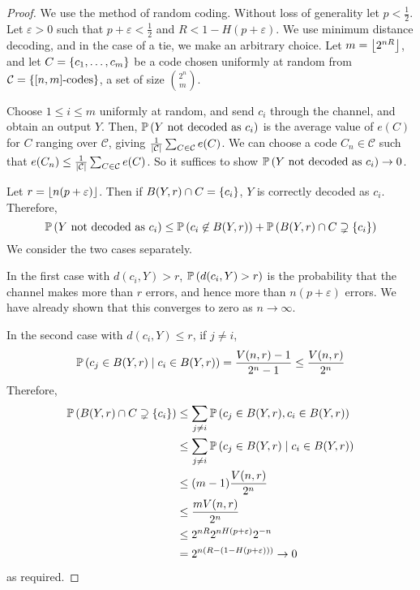 \begin{proof}
    We use the method of random coding.
    Without loss of generality let \( p < \frac{1}{2} \).
    Let \( \varepsilon > 0 \) such that \( p + \varepsilon < \frac{1}{2} \) and \( R < 1 - H(p + \varepsilon) \).
    We use minimum distance decoding, and in the case of a tie, we make an arbitrary choice.
    Let \( m = \floor*{2^{nR}} \), and let \( C = \qty{c_1, \dots, c_m} \) be a code chosen uniformly at random from \( \mathcal C = \qty{[n,m]\text{-codes}} \), a set of size \( \binom{2^n}{m} \).

    Choose \( 1 \leq i \leq m \) uniformly at random, and send \( c_i \) through the channel, and obtain an output \( Y \).
    Then, \( \prob{Y \text{ not decoded as } c_i} \) is the average value of \( e(C) \) for \( C \) ranging over \( \mathcal C \), giving \( \frac{1}{\abs{\mathcal C}} \sum_{C \in \mathcal C} e(C) \).
    We can choose a code \( C_n \in \mathcal C \) such that \( e(C_n) \leq \frac{1}{\abs{\mathcal C}}\sum_{C \in \mathcal C} e(C) \).
    So it suffices to show \( \prob{Y \text{ not decoded as } c_i} \to 0 \).

    Let \( r = \floor*{n(p + \varepsilon)} \).
    Then if \( B(Y,r) \cap C = \qty{c_i} \), \( Y \) is correctly decoded as \( c_i \).
    Therefore,
    \[ \prob{Y \text{ not decoded as } c_i} \leq \prob{c_i \not\in B(Y,r)} + \prob{B(Y,r) \cap C \supsetneq \qty{c_i}} \]
    We consider the two cases separately.

    In the first case with \( d(c_i,Y) > r \), \( \prob{d(c_i,Y) > r} \) is the probability that the channel makes more than \( r \) errors, and hence more than \( n(p + \varepsilon) \) errors.
    We have already shown that this converges to zero as \( n \to \infty \).

    In the second case with \( d(c_i,Y) \leq r \), if \( j \neq i \),
    \[ \prob{c_j \in B(Y,r) \mid c_i \in B(Y,r)} = \frac{V(n,r) - 1}{2^n - 1} \leq \frac{V(n,r)}{2^n} \]
    Therefore,
    \begin{align*}
        \prob{B(Y,r) \cap C \supsetneq \qty{c_i}} &\leq \sum_{j \neq i} \prob{c_j \in B(Y,r), c_i \in B(Y,r)} \\
        &\leq \sum_{j \neq i} \prob{c_j \in B(Y,r) \mid c_i \in B(Y,r)} \\
        &\leq (m-1) \frac{V(n,r)}{2^n} \\
        &\leq \frac{mV(n,r)}{2^n} \\
        &\leq 2^{nR} 2^{nH(p+\varepsilon)} 2^{-n} \\
        &= 2^{n(R - (1 - H(p+\varepsilon)))} \to 0
    \end{align*}
    as required.
\end{proof}
